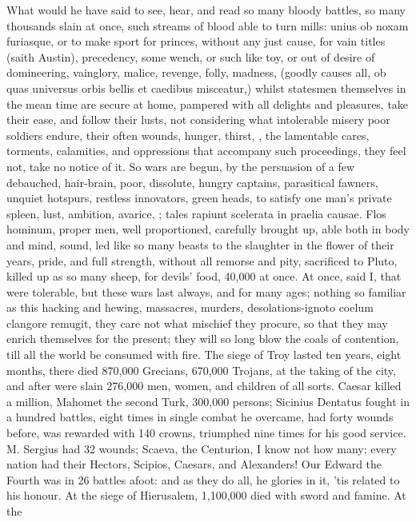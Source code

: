 {What would he have said to see, hear, and read so many bloody battles,
so many thousands slain at once, such streams of blood able to turn
mills: unius ob noxam furiasque, or to make sport for princes, without
any just cause, for vain titles (saith Austin), precedency, some
wench, or such like toy, or out of desire of domineering, vainglory,
malice, revenge, folly, madness, (goodly causes all, ob quas universus
orbis bellis et caedibus misceatur,) whilst statesmen themselves in the
mean time are secure at home, pampered with all delights and pleasures,
take their ease, and follow their lusts, not considering what
intolerable misery poor soldiers endure, their often wounds, hunger,
thirst, \etc{}, the lamentable cares, torments, calamities, and
oppressions that accompany such proceedings, they feel not, take no
notice of it. So wars are begun, by the persuasion of a few debauched,
hair-brain, poor, dissolute, hungry captains, parasitical fawners,
unquiet hotspurs, restless innovators, green heads, to satisfy one
man's private spleen, lust, ambition, avarice, \etc{}; tales rapiunt
scelerata in praelia causae. Flos hominum, proper men, well
proportioned, carefully brought up, able both in body and mind, sound,
led like so many beasts to the slaughter in the flower of their
years, pride, and full strength, without all remorse and pity,
sacrificed to Pluto, killed up as so many sheep, for devils' food,
40,000 at once. At once, said I, that were tolerable, but these wars
last always, and for many ages; nothing so familiar as this hacking and
hewing, massacres, murders, desolations-ignoto coelum clangore remugit,
they care not what mischief they procure, so that they may enrich
themselves for the present; they will so long blow the coals of
contention, till all the world be consumed with fire. The siege of
Troy lasted ten years, eight months, there died 870,000 Grecians,
670,000 Trojans, at the taking of the city, and after were slain
276,000 men, women, and children of all sorts. Caesar killed a million,
Mahomet the second Turk, 300,000 persons; Sicinius Dentatus fought
in a hundred battles, eight times in single combat he overcame, had
forty wounds before, was rewarded with 140 crowns, triumphed nine times
for his good service. M. Sergius had 32 wounds; Scaeva, the Centurion,
I know not how many; every nation had their Hectors, Scipios, Caesars,
and Alexanders! Our Edward the Fourth was in 26 battles afoot: and
as they do all, he glories in it, 'tis related to his honour. At the
siege of Hierusalem, 1,100,000 died with sword and famine. At the
}
